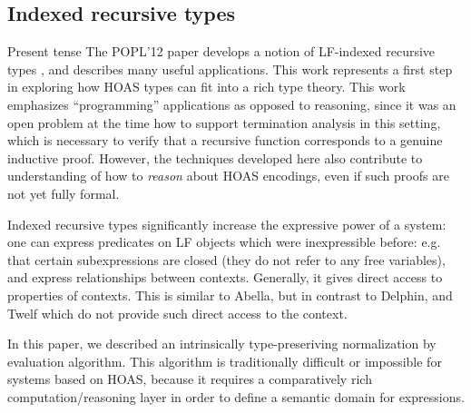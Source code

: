 \documentclass{article}
\newcommand{\LONGVERSION}[1]{{\color{light-gray}#1}}
\begin{document}
\subsection{Indexed recursive types}
\LONGVERSION{Present tense}
The POPL'12 paper develops a notion of LF-indexed recursive types
\citep{Cave12}, and describes many useful applications. This work represents a
first step in exploring how HOAS types can fit
into a rich type theory. This work emphasizes ``programming'' applications
as opposed to reasoning, since it was an open problem at the time how
to support termination analysis in this setting, which is necessary to
verify that a recursive function corresponds to a genuine inductive proof. However, the techniques
developed here also contribute to understanding of how to \emph{reason} about
HOAS encodings, even if such proofs are not yet fully formal.

Indexed recursive types significantly increase the expressive power of a system: one can express
predicates on LF objects which were inexpressible before: e.g. that
certain subexpressions are closed (they do not refer to any free variables), and express relationships between
contexts. Generally, it gives direct access to properties of
contexts. This is similar to Abella, but in contrast to Delphin, and Twelf which do not
provide such direct access to the context.

In this paper, we described an intrinsically type-preseriving
normalization by evaluation algorithm. This algorithm is traditionally
difficult or impossible for systems based on HOAS, because it requires
a comparatively rich computation/reasoning layer in order to define a semantic domain for expressions.
\end{document}
